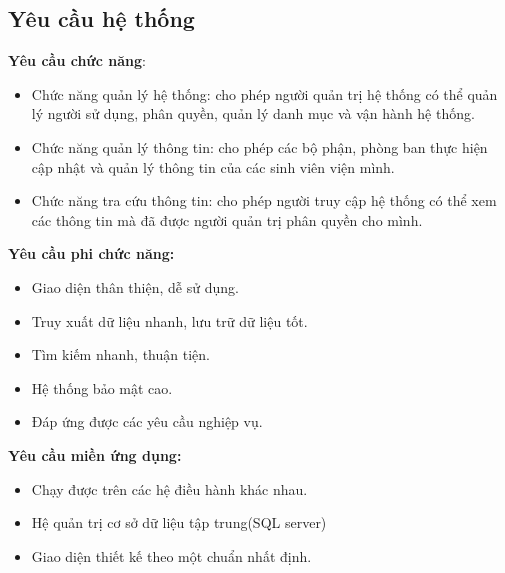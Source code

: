 \subsection{Yêu cầu hệ thống}
\textbf{Yêu cầu chức năng}:
\begin{itemize}
  \item Chức năng quản lý hệ thống: cho phép người quản trị hệ thống có thể quản lý người sử dụng, phân quyền, quản lý danh mục và vận hành hệ thống.
  \item Chức năng quản lý thông tin: cho phép các bộ phận, phòng ban thực hiện cập nhật và quản lý thông tin của các sinh viên viện mình.
  \item Chức năng tra cứu thông tin: cho phép người truy cập hệ thống có thể xem các thông tin mà đã được người quản trị phân quyền cho mình.
\end{itemize}
\textbf{Yêu cầu phi chức năng:}
\begin{itemize}
  \item Giao diện thân thiện, dễ sử dụng.
  \item Truy xuất dữ liệu nhanh, lưu trữ dữ liệu tốt.
  \item Tìm kiếm nhanh, thuận tiện.
  \item Hệ thống bảo mật cao.
  \item Đáp ứng được các yêu cầu nghiệp vụ.
\end{itemize}
\textbf{Yêu cầu miền ứng dụng:}
\begin{itemize}
  \item Chạy được trên các hệ điều hành khác nhau.
  \item Hệ quản trị cơ sở dữ liệu tập trung(SQL server)
  \item Giao diện thiết kế theo một chuẩn nhất định.
\end{itemize}